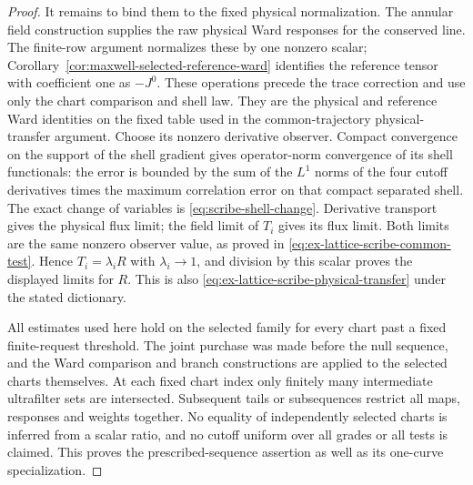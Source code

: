 \begin{proof}
It remains to bind them to the fixed physical normalization. The
annular field construction supplies the raw physical Ward responses
for the conserved line. The finite-row argument normalizes these by
one nonzero scalar; Corollary~\ref{cor:maxwell-selected-reference-ward}
identifies the reference tensor with coefficient one as $-J^0$.
These operations precede the trace correction and use only the chart
comparison and shell law. They are the physical and reference Ward
identities on the fixed table used in the common-trajectory physical-transfer
argument. Choose its nonzero derivative observer. Compact convergence
on the support of the shell gradient gives operator-norm convergence
of its shell functionals: the error is bounded by the sum of the
$L^1$ norms of the four cutoff derivatives times the maximum correlation
error on that compact separated shell. The exact change of variables
is \eqref{eq:scribe-shell-change}. Derivative transport gives the
physical flux limit; the field limit of $T_i$ gives its flux limit.
Both limits are the same nonzero observer value, as proved in
\eqref{eq:ex-lattice-scribe-common-test}. Hence $T_i=\lambda_iR$
with $\lambda_i\to1$, and division by this scalar proves the displayed
limits for $R$. This is also
\eqref{eq:ex-lattice-scribe-physical-transfer} under the stated dictionary.

All estimates used here hold on the selected family for every chart
past a fixed finite-request threshold. The joint purchase was made
before the null sequence, and the Ward comparison and branch constructions are
applied to the selected charts themselves. At each fixed chart index
only finitely many intermediate ultrafilter sets are intersected.
Subsequent tails or subsequences restrict all maps, responses and
weights together. No equality of independently selected charts is
inferred from a scalar ratio, and no cutoff uniform over all grades
or all tests is claimed. This proves the prescribed-sequence assertion
as well as its one-curve specialization.
\end{proof}
